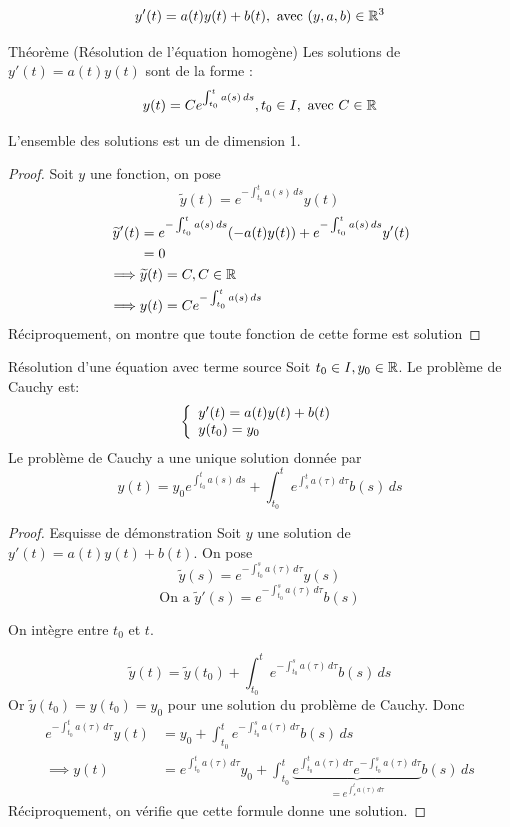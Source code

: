 \documentclass[]{report}
\begin{document}
\[y'(t)=a(t)y(t)+b(t),\text{ avec }(y,a,b)\in\mathbb{R}^3\]

\begin{tm}{Théorème (Résolution de l'équation homogène)}{}
    Les solutions de $y'(t)=a(t)y(t)$ sont de la forme :
    \[y(t)=Ce^{\int_{t_0}^t a(s)\,ds},t_0\in I,\text{ avec }C\in\mathbb{R}\]
    \begin{center}
        L'ensemble des solutions est un \ev de dimension 1.
    \end{center}
\end{tm}

\begin{proof}
    Soit $y$ une fonction, on pose
    \[\widetilde{y}(t)=e^{-\int_{t_0}^t a(s)\,ds}y(t)\]
    \begin{align*}
        \widetilde{y}'(t)&=e^{-\int_{t_0}^t a(s)\,ds}(-a(t)y(t))+e^{-\int_{t_0}^t a(s)\,ds}y'(t)\\
        &= 0\\
        \implies& \widetilde{y}(t)=C,C\in\mathbb{R} \\
        \implies& y(t)=C e^{-\int_{t_0}^t a(s)\,ds}
    \end{align*}
    Réciproquement, on montre que toute fonction de cette forme est solution
\end{proof}

\begin{tm}{Résolution d'une équation avec terme source}{}
    Soit $t_0\in I, y_0\in \mathbb{R}$. Le problème de Cauchy est:
    \[\left\{\begin{array}{ll} y'(t)=a(t)y(t)+b(t)\\ y(t_0)=y_0 \end{array} \right.\]
    Le problème de Cauchy a une unique solution donnée par
    \[y(t)=y_0 e^{\int_{t_0}^t a(s)\,ds}+\int_{t_0}^t e^{\int_{s}^t a(\tau)\,d\tau}b(s)\,ds\]
\end{tm}

\begin{proof}{Esquisse de démonstration}{}
    Soit $y$ une solution de $y'(t)=a(t)y(t)+b(t)$. On pose
    \[\widetilde{y}(s)=e^{-\int_{t_0}^s a(\tau)\,d\tau}y(s)\]
    \[\text{On a }\widetilde{y}'(s)=e^{-\int_{t_0}^s a(\tau)\,d\tau}b(s)\]
    \begin{center}
        On intègre entre $t_0$ et $t$.
    \end{center}
    \[\widetilde{y}(t)=\widetilde{y}(t_0)+\int_{t_0}^t e^{-\int_{t_0}^s a(\tau)\,d\tau}b(s)\,ds\]
    Or $\widetilde{y}(t_0)=y(t_0)=y_0$ pour une solution du problème de Cauchy. Donc
    \begin{align*}
        e^{-\int_{t_0}^t a(\tau)\,d\tau}y(t)&=y_0+\int_{t_0}^t e^{-\int_{t_0}^s a(\tau)\,d\tau}b(s)\,ds\\
        \implies y(t)&=e^{\int_{t_0}^t a(\tau)\,d\tau}y_0+\int_{t_0}^t \underset{=e^{\int_s^t a(\tau)\,d\tau}}{\underbrace{e^{\int_{t_0}^ta(\tau)\,d\tau} e^{-\int_{t_0}^s a(\tau)\,d\tau}}} b(s)\,ds
    \end{align*}
    Réciproquement, on vérifie que cette formule donne une solution.
\end{proof}
\end{document}
